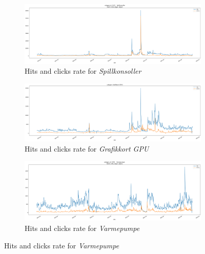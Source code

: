 \begin{figure}[h!]
  \centering
  \caption{Category plots of hits and click rate from 2019-2021}
  \label{fig:lineplot2}

  \begin{subfigure}[b]{\textwidth}
      \includegraphics[width=\textwidth]{./figs/code_generated/data_exploration/lineplot_43_Spillkonsoller.png}
      \hfill
      \caption{Hits and clicks rate for \textit{Spillkonsoller}}
      \label{fig:lineplot-Spillkonsoller}
  \end{subfigure}
  \begin{subfigure}[b]{\textwidth}
      \includegraphics[width=\textwidth]{./figs/code_generated/data_exploration/lineplot_30_gpu.png}
      \hfill
      \caption{Hits and clicks rate for \textit{Grafikkort GPU}}
      \label{fig:lineplot-GPU}
  \end{subfigure}
  
  \begin{subfigure}[b]{\textwidth}
      \includegraphics[width=\textwidth]{./figs/code_generated/data_exploration/lineplot_11054_Varmepumpe.png}
      \hfill
      \caption{Hits and clicks rate for \textit{Varmepumpe}}
      \label{fig:lineplot-Varmepumpe}
  \end{subfigure}
\end{figure}

